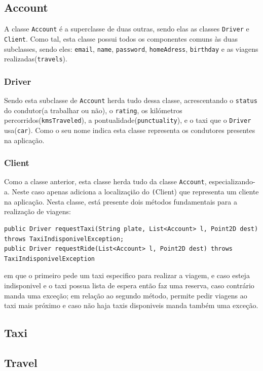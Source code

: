 \documentclass[a4paper,10pt,portuguese]{article}
\begin{document}
\subsection{Account}
A classe \texttt{Account} é a superclasse de duas outras, sendo elas as classes \texttt{Driver} e \texttt{Client}. Como tal, esta classe possui todos os componentes comuns às duas subclasses, sendo eles: \texttt{email}, \texttt{name}, \texttt{password}, \texttt{homeAdress}, \texttt{birthday} e as viagens realizadas(\texttt{travels}).

\subsubsection{Driver}
Sendo esta subclasse de \texttt{Account} herda tudo dessa classe, acrescentando o \texttt{status} do condutor(a trabalhar ou não), o \texttt{rating}, os kilómetros percorridos(\texttt{kmsTraveled}), a pontualidade(\texttt{punctuality}), e o taxi que o \texttt{Driver} usa(\texttt{car}). Como o seu nome indica esta classe representa os condutores presentes na aplicação.

\subsubsection{Client}
Como a classe anterior, esta classe herda tudo da classe \texttt{Account}, especializando-a. Neste caso apenas adiciona a localizaçião do \texttt(Client) que representa um cliente na aplicação. Nesta classe, está presente dois métodos fundamentais para a realização de viagens:
\begin{verbatim}
public Driver requestTaxi(String plate, List<Account> l, Point2D dest) throws TaxiIndisponivelException;
public Driver requestRide(List<Account> l, Point2D dest) throws TaxiIndisponivelException
\end{verbatim}
em que o primeiro pede um taxi especifico para realizar a viagem, e caso esteja indisponivel e o taxi possua lista de espera então faz uma reserva, caso contrário manda uma exceção; em relação ao segundo método, permite pedir viagens ao taxi mais próximo e caso não haja taxis disponiveis manda também uma exceção. 

\subsection{Taxi}
\label{Taxi}
\label{Motorbike}
\subsection{Travel}
\end{document}
